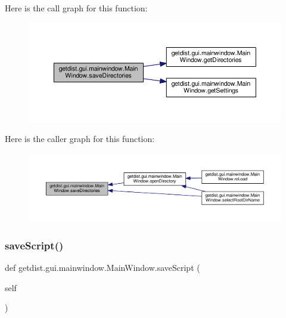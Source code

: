 Here is the call graph for this function\+:
\nopagebreak
\begin{figure}[H]
\begin{center}
\leavevmode
\includegraphics[width=350pt]{classgetdist_1_1gui_1_1mainwindow_1_1MainWindow_ad54b990be48269b8e9375dac2a68ee9c_cgraph}
\end{center}
\end{figure}
Here is the caller graph for this function\+:
\nopagebreak
\begin{figure}[H]
\begin{center}
\leavevmode
\includegraphics[width=350pt]{classgetdist_1_1gui_1_1mainwindow_1_1MainWindow_ad54b990be48269b8e9375dac2a68ee9c_icgraph}
\end{center}
\end{figure}
\mbox{\label{classgetdist_1_1gui_1_1mainwindow_1_1MainWindow_a6a523a1ab4ce1b0cb299e7b0f44f9651}} 
\subsubsection{\texorpdfstring{save\+Script()}{saveScript()}}
{\footnotesize\ttfamily def getdist.\+gui.\+mainwindow.\+Main\+Window.\+save\+Script (\begin{DoxyParamCaption}\item[{}]{self }\end{DoxyParamCaption})}

